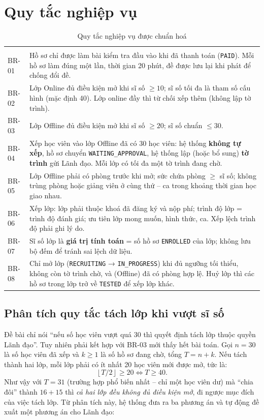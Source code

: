 \section{Quy tắc nghiệp vụ}
\label{sec:br}
\begin{xltabular}{\linewidth}{|l|Y|}
  \caption{Quy tắc nghiệp vụ được chuẩn hoá}\label{tab:br}\\ \hline
  \headrow {} &  \\ \hline
  \endfirsthead \hline
  \headrow {} &  \\ \hline
  \endhead
  BR-01 & Hồ sơ chỉ được làm bài kiểm tra đầu vào khi đã thanh toán (\texttt{PAID}). Mỗi hồ sơ làm đúng một lần, thời gian 20 phút, đề được lưu lại khi phát để chống đổi đề. \\ \hline
  BR-02 & Lớp Online đủ điều kiện mở khi sĩ số $\geq 10$; sĩ số tối đa là tham số cấu hình (mặc định 40). Lớp online đầy thì từ chối xếp thêm (không lập tờ trình). \\ \hline
  BR-03 & Lớp Offline đủ điều kiện mở khi sĩ số $\geq 20$; sĩ số chuẩn $\leq 30$. \\ \hline
  BR-04 & Xếp học viên vào lớp Offline đã có 30 học viên: hệ thống \textbf{không tự xếp}, hồ sơ chuyển \texttt{WAITING\_APPROVAL}, hệ thống lập (hoặc bổ sung) \textbf{tờ trình} gửi Lãnh đạo. Mỗi lớp có tối đa một tờ trình đang chờ. \\ \hline
  BR-05 & Lớp Offline phải có phòng trước khi mở; sức chứa phòng $\geq$ sĩ số; không trùng phòng hoặc giảng viên ở cùng thứ – ca trong khoảng thời gian học giao nhau. \\ \hline
  BR-06 & Xếp lớp: lớp phải thuộc khoá đã đăng ký và nộp phí; trình độ lớp = trình độ đánh giá; ưu tiên lớp mong muốn, hình thức, ca. Xếp lệch trình độ phải ghi lý do. \\ \hline
  BR-07 & Sĩ số lớp là \textbf{giá trị tính toán} = số hồ sơ \texttt{ENROLLED} của lớp; không lưu bộ đếm để tránh sai lệch dữ liệu. \\ \hline
  BR-08 & Chỉ mở lớp (\texttt{RECRUITING} → \texttt{IN\_PROGRESS}) khi đủ ngưỡng tối thiểu, không còn tờ trình chờ, và (Offline) đã có phòng hợp lệ. Huỷ lớp thì các hồ sơ trong lớp trở về \texttt{TESTED} để xếp lớp khác. \\ \hline
\end{xltabular}

\subsection{Phân tích quy tắc tách lớp khi vượt sĩ số}
Đề bài chỉ nói “nếu số học viên vượt quá 30 thì quyết định tách lớp thuộc quyền Lãnh đạo”. Tuy nhiên phải kết hợp với BR-03 mới thấy hết bài toán. Gọi $n = 30$ là số học viên đã xếp và $k \geq 1$ là số hồ sơ đang chờ, tổng $T = n + k$. Nếu tách thành hai lớp, mỗi lớp phải có ít nhất 20 học viên mới được mở, tức là:
\[
  \left\lfloor T/2 \right\rfloor \geq 20 \iff T \geq 40 .
\]
Như vậy với $T = 31$ (trường hợp phổ biến nhất – chỉ một học viên dư) mà “chia đôi” thành $16 + 15$ thì \emph{cả hai lớp đều không đủ điều kiện mở}, đi ngược mục đích của việc tách lớp. Từ phân tích này, hệ thống đưa ra ba phương án và tự động đề xuất một phương án cho Lãnh đạo:


